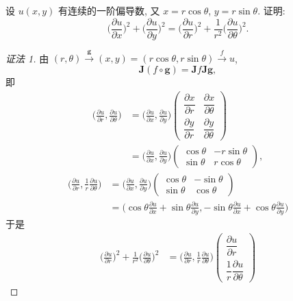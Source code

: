 \begin{example}\label{ex:8.2.6}
设 $u(x, y)$ 有连续的一阶偏导数, 又 $x = r\cos\theta$, $y = r\sin\theta$. 证明:
\[
  \Big(\frac{\partial u}{\partial x}\Big)^{2} + \Big(\frac{\partial u}{\partial y}\Big)^{2} = \Big(\frac{\partial u}{\partial r}\Big)^{2} + \frac{1}{r^{2}}\Big(\frac{\partial u}{\partial \theta}\Big)^{2}.
\]

\begin{proof}[证法 1]
由 $(r, \theta) \xrightarrow{\boldsymbol{g}} (x, y) = (r\cos\theta, r\sin\theta) \xrightarrow{f} u$,
\[
  \boldsymbol{J}(f \circ \boldsymbol{g}) = \boldsymbol{J}f\boldsymbol{J}\boldsymbol{g},
\]
即
\begin{align*}
  \Big(\frac{\partial u}{\partial r}, \frac{\partial u}{\partial \theta}\Big)
  &= \Big(\frac{\partial u}{\partial x}, \frac{\partial u}{\partial y}\Big)\begin{pmatrix}
    \dfrac{\partial x}{\partial r} & \dfrac{\partial x}{\partial \theta} \\[2mm]
    \dfrac{\partial y}{\partial r} & \dfrac{\partial y}{\partial \theta}
  \end{pmatrix} \\
  &= \Big(\frac{\partial u}{\partial x}, \frac{\partial u}{\partial y}\Big)\begin{pmatrix}
    \cos\theta & -r\sin\theta \\
    \sin\theta & r\cos\theta
  \end{pmatrix},
\end{align*}
\begin{align*}
  \Big(\frac{\partial u}{\partial r}, \frac{1}{r}\frac{\partial u}{\partial \theta}\Big)
  &= \Big(\frac{\partial u}{\partial x}, \frac{\partial u}{\partial y}\Big)\begin{pmatrix}
    \cos\theta & -\sin\theta \\
    \sin\theta & \cos\theta
  \end{pmatrix} \\
  &= \Big(\cos\theta\frac{\partial u}{\partial x} + \sin\theta\frac{\partial u}{\partial y}, -\sin\theta\frac{\partial u}{\partial x} + \cos\theta\frac{\partial u}{\partial y}\Big)
\end{align*}
于是
\begin{align*}
  \Big(\frac{\partial u}{\partial r}\Big)^{2} + \frac{1}{r^{2}}\Big(\frac{\partial u}{\partial \theta}\Big)^{2}
  &= \Big(\frac{\partial u}{\partial r}, \frac{1}{r}\frac{\partial u}{\partial \theta}\Big)\begin{pmatrix}
    \dfrac{\partial u}{\partial r} \\[2mm] \dfrac{1}{r}\dfrac{\partial u}{\partial \theta}

\end{pmatrix}
\end{align*}
\end{proof}
\end{example}
